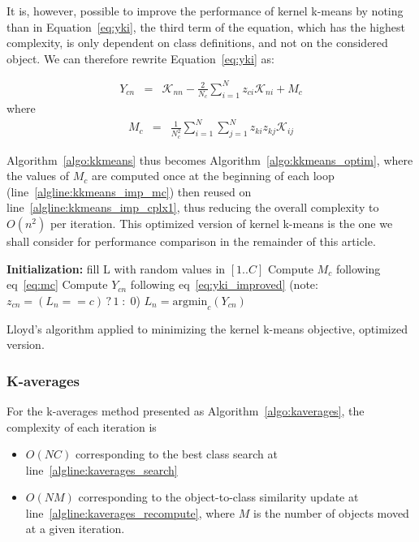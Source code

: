 \documentclass[a4paper,twoside]{article}
\begin{document}
It is, however, possible to improve the performance of kernel k-means by noting than in Equation~\ref{eq:yki}, the third term of the equation, which has the highest complexity, is only dependent on class definitions, and not on the considered object. We can therefore rewrite Equation~\ref{eq:yki} as:

\begin{eqnarray}
Y_{cn} & = & \mathcal{K}_{nn} - \frac{2}{N_c} \sum_{i=1}^{N} z_{ci} \mathcal{K}_{ni} + M_c \label{eq:yki_improved}
\end{eqnarray}
where
\begin{eqnarray}
M_c    & = & \frac{1}{N_c^2} \sum_{i=1}^{N} \sum_{j=1}^{N} z_{ki} z_{kj} \mathcal{K}_{ij} \label{eq:mc}
\end{eqnarray}

Algorithm~\ref{algo:kkmeans} thus becomes Algorithm~\ref{algo:kkmeans_optim}, where the values of $M_c$ are computed once at the beginning of each loop (line~\ref{algline:kkmeans_imp_mc}) then reused on line~\ref{algline:kkmeans_imp_cplx1}, thus reducing the overall complexity to $O(n^2)$ per iteration. This optimized version of kernel k-means is the one we shall consider for performance comparison in the remainder of this article.

\begin{algorithm}
	\label{algo:kkmeans_optim}
	\SetAlgoLined
	\BlankLine	
	\textbf{Initialization:}
	fill L with random values in $[1..C]$\;
	\BlankLine	
	 {
	     {
	        Compute $M_c$ following eq~\ref{eq:mc} \label{algline:kkmeans_imp_mc}
	    }
		 {
			 {
				Compute $Y_{cn}$ following eq~\ref{eq:yki_improved} \label{algline:kkmeans_imp_cplx1}
				(note: $z_{cn} = (L_n == c)\,?\,1\;:\;0$)
			}
			$L_n = \textrm{argmin}_c (Y_{cn})$\;
		}
	}
	\BlankLine
	\caption{Lloyd's algorithm applied to minimizing the kernel k-means objective, optimized version.}
\end{algorithm}


\subsubsection{K-averages}

For the k-averages method presented as Algorithm~\ref{algo:kaverages}, the complexity of each iteration is
\begin{itemize}
\item $O(NC)$ corresponding to the best class search at line~\ref{algline:kaverages_search}
\item  $O(NM)$ corresponding to the object-to-class similarity update at line~\ref{algline:kaverages_recompute}, where $M$ is the number of objects moved at a given iteration.
\end{itemize}
\end{document}
